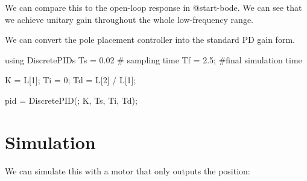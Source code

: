 \documentclass[
  a4paper,
  DIV=11,
  numbers=noendperiod]{scrreprt}
\newenvironment{Shaded}{\begin{snugshade}}{\end{snugshade}}
\newcommand{\BuiltInTok}[1]{\textcolor[rgb]{0.00,0.23,0.31}{#1}}
\newcommand{\CommentTok}[1]{\textcolor[rgb]{0.37,0.37,0.37}{#1}}
\newcommand{\FloatTok}[1]{\textcolor[rgb]{0.68,0.00,0.00}{#1}}
\newcommand{\FunctionTok}[1]{\textcolor[rgb]{0.28,0.35,0.67}{#1}}
\newcommand{\ImportTok}[1]{\textcolor[rgb]{0.00,0.46,0.62}{#1}}
\newcommand{\NormalTok}[1]{\textcolor[rgb]{0.00,0.23,0.31}{#1}}
\newcommand{\OperatorTok}[1]{\textcolor[rgb]{0.37,0.37,0.37}{#1}}
\begin{document}
We can compare this to the open-loop response in @start-bode. We can see
that we achieve unitary gain throughout the whole low-frequency range.

We can convert the pole placement controller into the standard PD gain
form.

\begin{Shaded}
\begin{Highlighting}[]
\ImportTok{using} \BuiltInTok{DiscretePIDs}
\NormalTok{Ts }\OperatorTok{=} \FloatTok{0.02} \CommentTok{\# sampling time}
\NormalTok{Tf }\OperatorTok{=} \FloatTok{2.5}\NormalTok{; }\CommentTok{\#final simulation time}

\NormalTok{K }\OperatorTok{=}\NormalTok{ L[}\FloatTok{1}\NormalTok{];}
\NormalTok{Ti }\OperatorTok{=} \FloatTok{0}\NormalTok{;}
\NormalTok{Td }\OperatorTok{=}\NormalTok{ L[}\FloatTok{2}\NormalTok{] }\OperatorTok{/}\NormalTok{ L[}\FloatTok{1}\NormalTok{];}

\NormalTok{pid }\OperatorTok{=} \FunctionTok{DiscretePID}\NormalTok{(; K, Ts, Ti, Td);}
\end{Highlighting}
\end{Shaded}

\section{Simulation}\label{simulation-2}

We can simulate this with a motor that only outputs the position:
\end{document}
